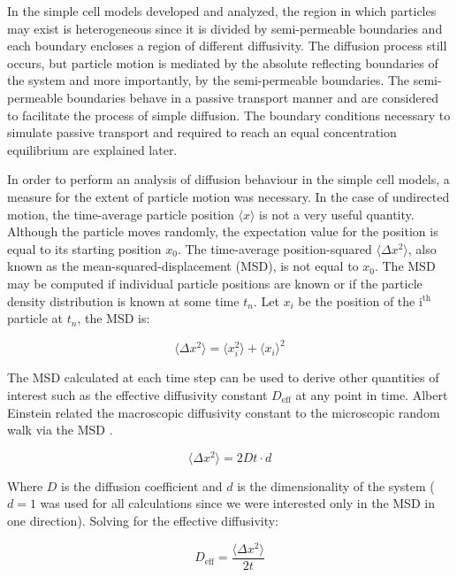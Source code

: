 	In the simple cell models developed and analyzed, the region in which particles may exist is heterogeneous since it is divided by semi-permeable boundaries and each boundary encloses a region of different diffusivity. The diffusion process still occurs, but particle motion is mediated by the absolute reflecting boundaries of the system and more importantly, by the semi-permeable boundaries. The semi-permeable boundaries behave in a passive transport manner and are considered to facilitate the process of simple diffusion. The boundary conditions necessary to simulate passive transport and required to reach an equal concentration equilibrium are explained later.
	
	In order to perform an analysis of diffusion behaviour in the simple cell models, a measure for the extent of particle motion was necessary. In the case of undirected motion, the time-average particle position $ \langle x \rangle $ is not a very useful quantity. Although the particle moves randomly, the expectation value for the position is equal to its starting position $ x_0 $. The time-average position-squared $ \langle \Delta x^2 \rangle $, also known as the mean-squared-displacement (MSD), is not equal to $ x_0 $. The MSD may be computed if individual particle positions are known or if the particle density distribution is known at some time $ t_n $. Let $ x_i $ be the position of the $ \textrm{i}^\textrm{th} $ particle at $ t_n $, the MSD is:
		
	\begin{equation}
		\langle \Delta x^2 \rangle = \langle x_{i}^2 \rangle + \langle x_i \rangle^2
	\end{equation}
	
	The MSD calculated at each time step can be used to derive other quantities of interest such as the effective diffusivity constant $ D_\textrm{eff} $ at any point in time. Albert Einstein related the macroscopic diffusivity constant to the microscopic random walk via the MSD \citep{diffusion-1}.
	
	\begin{equation}
	\label{eq:einstein-diffusion-steady}
		\langle \Delta x^2 \rangle = 2Dt \cdot d
	\end{equation}
		
	Where $ D $ is the diffusion coefficient and $ d $ is the dimensionality of the system ($ d = 1 $ was used for all calculations since we were interested only in the MSD in one direction). Solving for the effective diffusivity:
	
	\begin{equation}
		D_\textrm{eff} = \dfrac{\langle \Delta x^2 \rangle}{2t}
	\end{equation}	
	

